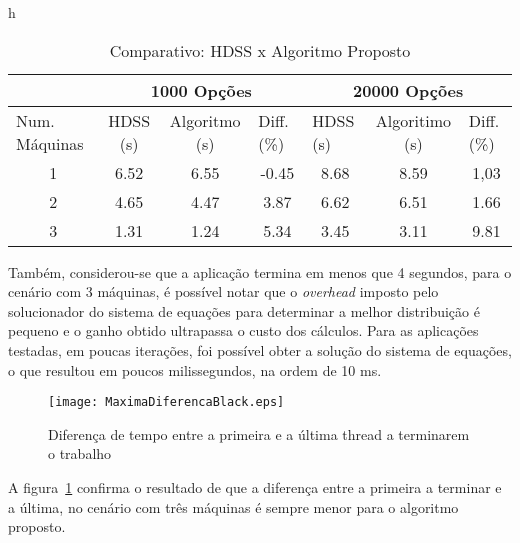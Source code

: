 \begin{table}{h}
\centering
\tiny
\caption{Comparativo: HDSS x Algoritmo Proposto}

\begin{tabular}{c|c|c|c|c|c|c|}
\cline{2-7}
\multicolumn{1}{l|}{}                 & \multicolumn{3}{c|}{1000 Opções}                              & \multicolumn{3}{c|}{20000 Opções}                                                  \\ \hline
\multicolumn{1}{|l|}{Num. Máquinas} & HDSS (s) & Algoritmo (s) & \multicolumn{1}{l|}{Diff. (\%)} & \multicolumn{1}{l|}{HDSS (s)} & Algoritimo (s) & \multicolumn{1}{l|}{Diff. (\%)} \\ \hline
\multicolumn{1}{|c|}{1 }       & 6.52     & 6.55              & -0.45                           & 8.68                          & 8.59              & 1,03                            \\ \hline
\multicolumn{1}{|c|}{2 }      & 4.65     & 4.47              & 3.87                            & 6.62                          & 6.51              & 1.66                            \\ \hline
\multicolumn{1}{|c|}{3 }      & 1.31     & 1.24              & 5.34                            & 3.45                          & 3.11              &               9.81                  \\ \hline
\end{tabular}
\label{table: black}
\end{table}

Também, considerou-se que a aplicação termina em menos que 4 segundos, para o cenário com 3 máquinas, é possível notar que o \emph{overhead} imposto pelo solucionador do sistema de equações para determinar a melhor distribuição é pequeno e o ganho obtido ultrapassa o custo dos cálculos. Para as aplicações testadas, em poucas iterações, foi possível obter a solução do sistema de equações, o que resultou em poucos milissegundos, na ordem de 10 ms.

\begin{figure}[htb]
	\begin{center}
	\centering
			\texttt{[image: MaximaDiferencaBlack.eps]}
	\caption{Diferença de tempo entre a primeira e a última thread a terminarem o trabalho}
	\label{fig:diferencaThreadsBlack}
	\end{center}
\end{figure}

A figura~\ref{fig:diferencaThreadsBlack} confirma o resultado de que a diferença entre a primeira a terminar  e a última, no cenário com três máquinas é sempre menor para o algoritmo proposto.


